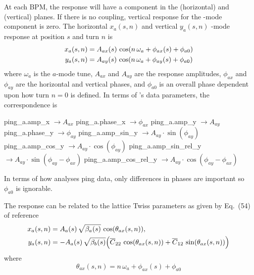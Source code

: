 \begin{description}
{At each BPM, the response will have a component in the  (horizontal) and  (vertical)
planes. If there is no coupling, vertical response for the -mode component is zero. The
horizontal $x_a(s, n)$ and vertical $y_a(s, n)$ -mode response at position $s$ and turn $n$
is
\begin{align}
  x_a(s, n) &= A_{ax}(s) \, \cos(n \, \omega_a + \phi_{ax}(s) + \phi_{a0}) \nonumber \\
  y_a(s, n) &= A_{ay}(s) \, \cos(n \, \omega_a + \phi_{ay}(s) + \phi_{a0})
  \label{xanop1}
\end{align}
where $\omega_a$ is the $a$-mode tune, $A_{ax}$ and $A_{ay}$ are the response amplitudes, $\phi_{ax}$
and $\phi_{ay}$ are the horizontal and vertical phases, and $\phi_{a0}$ is an overall phase
dependent upon how turn $n = 0$ is defined. In terms of \tao's data parameters, the correspondence
is
\begin{example}
    ping_a.amp_x         \(\longrightarrow A_{ax}\)
    ping_a.phase_x       \(\longrightarrow \phi_{ax}\)
    ping_a.amp_y         \(\longrightarrow A_{ay}\)
    ping_a.phase_y       \(\longrightarrow \phi_{ay}\)
    ping_a.amp_sin_y     \(\longrightarrow A_{ay}\cdot\sin(\phi_{ay})\)
    ping_a.amp_cos_y     \(\longrightarrow A_{ay}\cdot\cos(\phi_{ay})\)
    ping_a.amp_sin_rel_y \(\longrightarrow A_{ay}\cdot\sin(\phi_{ay}-\phi_{ax})\)
    ping_a.amp_cos_rel_y \(\longrightarrow A_{ay}\cdot\cos(\phi_{ay}-\phi_{ax})\)
\end{example}
In terms of how \tao analyses ping data, only differences in phases are important so $\phi_{a0}$ is
ignorable. 

The response can be related to the lattice Twiss parameters as given by Eq.~(54) of reference
\cite{b:linear.coupled}
\begin{align}
  x_a(s, n) &=  A_a(s) \, \sqrt{\beta_a(s)} \, \cos(\theta_{ax}(s,n)) , \nonumber \\
  y_a(s, n) &= -A_a(s) \, \sqrt{\beta_b(s)} \Bigl( \overline C_{22} \, \cos(\theta_{ax}(s,n)) +
     \overline C_{12} \, \sin(\theta_{ax}(s,n)) \Bigr)
  \label{xabno}
\end{align}
where
\begin{equation}
  \theta_{ax}(s,n) = n \, \omega_a + \phi_{ax}(s) + \phi_{a0}
\end{equation}

}
\end{description}
